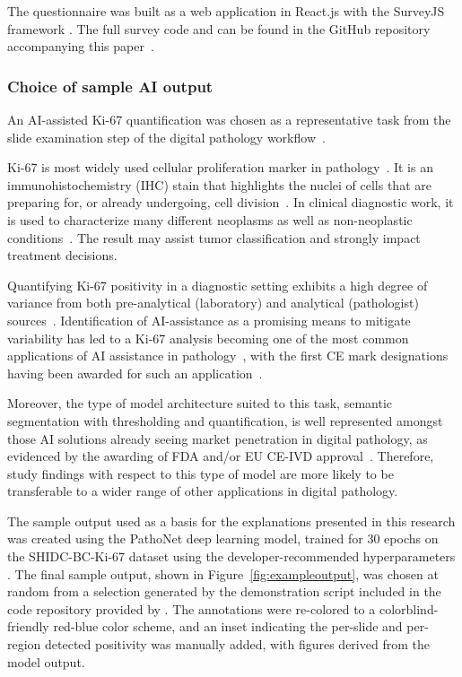 \documentclass[final,5p,times,twocolumn,hyphens]{elsarticle}
\begin{document}
The questionnaire was built as a web application in React.js with the SurveyJS framework \cite{devsoft-baltic-ou-2021}. The full survey code and can be found in the GitHub repository accompanying this paper~\cite{Evans_xAI_in_Digital_2022}.

\subsubsection{Choice of sample AI output}

An AI-assisted Ki-67 quantification was chosen as a representative task from the slide examination step of the digital pathology workflow~\cite{Kargl-et-al:2020:PathoWorkflows}.

Ki-67 is most widely used cellular proliferation marker in pathology~\cite{li2015ki67}. It is an immunohistochemistry (IHC) stain that highlights the nuclei of cells that are preparing for, or already undergoing, cell division~\cite{scholzen2000ki}. In clinical diagnostic work, it is used to characterize many different neoplasms as well as non-neoplastic conditions~\cite{nadler2013ki}. The result may assist tumor classification and strongly impact treatment decisions. 

Quantifying Ki-67 positivity in a diagnostic setting exhibits a high degree of variance from both pre-analytical (laboratory) and analytical (pathologist) sources~\cite{polley2015international, rimm2019international}. Identification of AI-assistance as a promising means to mitigate variability has led to a Ki-67 analysis becoming one of the most common applications of AI assistance in pathology~\cite{geread2021pinet, lakshmi2020deep, govind2020improving}, with the first CE mark designations having been awarded for such an application~\cite{business-wire-2021}.  

Moreover, the type of model architecture suited to this task, semantic segmentation with thresholding and quantification, is well represented amongst those AI solutions already seeing market penetration in digital pathology, as evidenced by the awarding of FDA and/or EU CE-IVD approval~\cite{garcia2019new}. Therefore, study findings with respect to this type of model are more likely to be transferable to a wider range of other applications in digital pathology.

The sample output used as a basis for the explanations presented in this research was created using the PathoNet deep learning model, trained for 30 epochs on the SHIDC-BC-Ki-67 dataset using the developer-recommended hyperparameters \cite{negahbani2021pathonet}. The final sample output, shown in Figure~\ref{fig:exampleoutput}, was chosen at random from a selection generated by the demonstration script included in the code repository provided by \citet{negahbani2021pathonet}. The annotations were re-colored to a colorblind-friendly red-blue color scheme, and an inset indicating the per-slide and per-region detected positivity was manually added, with figures derived from the model output.
\end{document}
